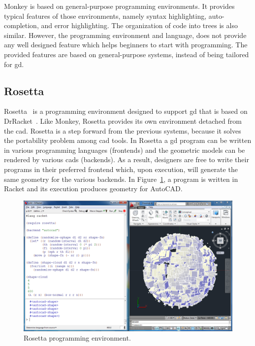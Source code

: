 Monkey is based on general-purpose programming environments. It provides typical features of those environments, namely syntax highlighting, auto-completion, and error highlighting. The organization of code into trees is also similar. However, the programming environment and language, does not provide any well designed feature which helps beginners to start with programming. The provided features are based on general-purpose systems, instead of being tailored for \gls{gd}.
\subsection{Rosetta}
\label{subsec:rosetta}
Rosetta~\citep{lopes2011portable} is a programming environment designed to support \gls{gd} that is based on DrRacket~\citep{findler2002drscheme}. Like Monkey, Rosetta provides its own environment detached from the \gls{cad}. Rosetta is a step forward from the previous systems, because it solves the portability problem among \gls{cad} tools. In Rosetta a \gls{gd} program can be written in various programming languages (frontends) and the geometric models can be rendered by various \glspl{cad} (backends). As a result, designers are free to write their programs in their preferred frontend which, upon execution, will generate the same geometry for the various backends. In Figure~\ref{fig:rosetta}, a program is written in Racket and its execution produces geometry for AutoCAD.

\begin{figure}[!htbp]
  \centering
  \includegraphics[width=1.0\textwidth]{images/rosetta1}
    \caption{Rosetta programming environment.}  
  \label{fig:rosetta}
\end{figure} 

